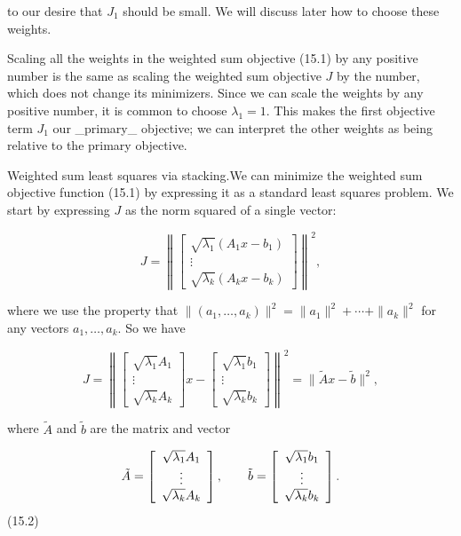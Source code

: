 to our desire that \(J_{1}\) should be small. We will discuss later how to choose these weights.

Scaling all the weights in the weighted sum objective (15.1) by any positive number is the same as scaling the weighted sum objective \(J\) by the number, which does not change its minimizers. Since we can scale the weights by any positive number, it is common to choose \(\lambda_{1}=1\). This makes the first objective term \(J_{1}\) our _primary_ objective; we can interpret the other weights as being relative to the primary objective.

Weighted sum least squares via stacking.We can minimize the weighted sum objective function (15.1) by expressing it as a standard least squares problem. We start by expressing \(J\) as the norm squared of a single vector:

\[J=\left\|\left[\begin{array}{c}\sqrt{\lambda_{1}}(A_{1}x-b_{1})\\ \vdots\\ \sqrt{\lambda_{k}}(A_{k}x-b_{k})\end{array}\right]\right\|^{2},\]

where we use the property that \(\|(a_{1},\ldots,a_{k})\|^{2}=\|a_{1}\|^{2}+\cdots+\|a_{k}\|^{2}\) for any vectors \(a_{1},\ldots,a_{k}\). So we have

\[J=\left\|\left[\begin{array}{c}\sqrt{\lambda_{1}}A_{1}\\ \vdots\\ \sqrt{\lambda_{k}}A_{k}\end{array}\right]x-\left[\begin{array}{c}\sqrt{ \lambda_{1}}b_{1}\\ \vdots\\ \sqrt{\lambda_{k}}b_{k}\end{array}\right]\right\|^{2}=\|\tilde{A}x-\tilde{b} \|^{2},\]

where \(\tilde{A}\) and \(\tilde{b}\) are the matrix and vector

\[\tilde{A}=\left[\begin{array}{c}\sqrt{\lambda_{1}}A_{1}\\ \vdots\\ \sqrt{\lambda_{k}}A_{k}\end{array}\right],\qquad\tilde{b}=\left[\begin{array}[ ]{c}\sqrt{\lambda_{1}}b_{1}\\ \vdots\\ \sqrt{\lambda_{k}}b_{k}\end{array}\right].\] (15.2)

